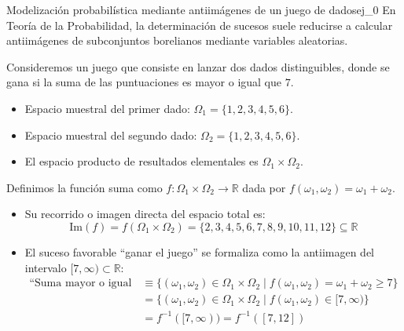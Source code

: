 \begin{ejemplo}{Modelización probabilística mediante antiimágenes de un juego de dados}{ej_0}
En Teoría de la Probabilidad, la determinación de sucesos suele reducirse a calcular antiimágenes de subconjuntos borelianos mediante variables aleatorias.

Consideremos un juego que consiste en lanzar dos dados distinguibles, donde se gana si la suma de las puntuaciones es mayor o igual que $7$.
\begin{itemize}
    \item Espacio muestral del primer dado: $\Omega_1 = \{1, 2, 3, 4, 5, 6\}$.
    \item Espacio muestral del segundo dado: $\Omega_2 = \{1, 2, 3, 4, 5, 6\}$.
    \item El espacio producto de resultados elementales es $\Omega_1 \times \Omega_2$.
\end{itemize}

Definimos la función suma como $f : \Omega_1 \times \Omega_2 \to \mathbb{R}$ dada por $f(\omega_1, \omega_2) = \omega_1 + \omega_2$.
\begin{itemize}
    \item Su recorrido o imagen directa del espacio total es:
    \[
        \mathrm{Im}(f) = f(\Omega_1 \times \Omega_2) = \{2, 3, 4, 5, 6, 7, 8, 9, 10, 11, 12\} \subseteq \mathbb{R}
    \]
    \item El suceso favorable ``ganar el juego'' se formaliza como la antiimagen del intervalo $[7, \infty) \subset \mathbb{R}$:
    \begin{align*}
        \text{``Suma mayor o igual que 7''} &\equiv \{ (\omega_1, \omega_2) \in \Omega_1 \times \Omega_2 \mid f(\omega_1, \omega_2) = \omega_1 + \omega_2 \ge 7 \} \\
        &= \{ (\omega_1, \omega_2) \in \Omega_1 \times \Omega_2 \mid f(\omega_1, \omega_2) \in [7, \infty) \} \\
        &= f^{-1}([7, \infty)) = f^{-1}([7, 12])
    \end{align*}
\end{itemize}
\end{ejemplo}

\begin{center}
    \vspace{0.2cm}
    \vspace{0.2cm}
\end{center}

